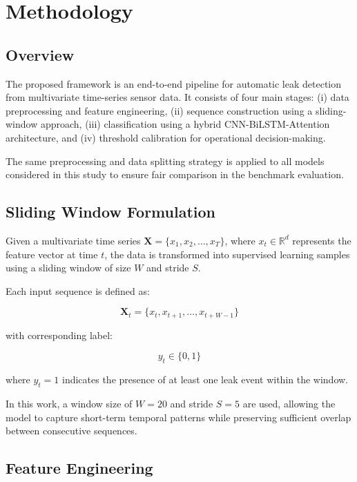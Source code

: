 \section{Methodology}

\subsection{Overview}

The proposed framework is an end-to-end pipeline for automatic leak detection
from multivariate time-series sensor data. It consists of four main stages:
(i) data preprocessing and feature engineering, (ii) sequence construction using
a sliding-window approach, (iii) classification using a hybrid CNN-BiLSTM-Attention
architecture, and (iv) threshold calibration for operational decision-making.

The same preprocessing and data splitting strategy is applied to all models
considered in this study to ensure fair comparison in the benchmark evaluation.

\subsection{Sliding Window Formulation}

Given a multivariate time series $\mathbf{X} = \{x_1, x_2, \dots, x_T\}$, where
$x_t \in \mathbb{R}^d$ represents the feature vector at time $t$, the data is
transformed into supervised learning samples using a sliding window of size $W$
and stride $S$.

Each input sequence is defined as:

\begin{equation}
\mathbf{X}_t = \{x_t, x_{t+1}, \dots, x_{t+W-1}\}
\end{equation}

with corresponding label:

\begin{equation}
y_t \in \{0,1\}
\end{equation}

where $y_t = 1$ indicates the presence of at least one leak event within the window.

In this work, a window size of $W = 20$ and stride $S = 5$ are used, allowing
the model to capture short-term temporal patterns while preserving sufficient
overlap between consecutive sequences.

\subsection{Feature Engineering}

